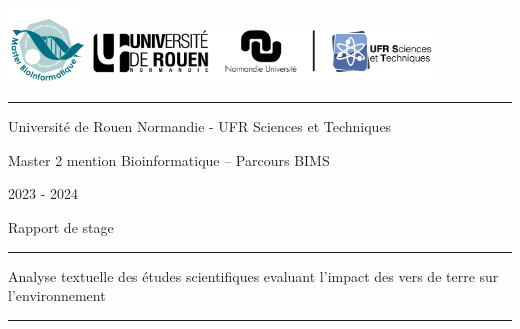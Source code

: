 \documentclass{book}
\begin{document}

\newpage
\thispagestyle{empty}
\vspace{-5cm}
\includegraphics[height=2cm]{univ.png}
\hfill
\includegraphics[height=1.5cm]{URN_NU_ST.jpg}

\vspace{0.5cm}
\hrule
\vspace{0.5cm}

\begin{center}
    \large{Université de Rouen Normandie - UFR Sciences et Techniques}
\end{center}

\begin{center}
    \large{Master 2 mention Bioinformatique – Parcours BIMS}
\end{center}

\begin{center}
    \large{2023 - 2024}
\end{center}

\vspace{1cm}

\begin{center}
    \Large{Rapport de stage}
\end{center}

\begin{center}
    \vspace{1cm}
    \hrule
    \vspace{1cm}
    \huge{Analyse textuelle des études scientifiques evaluant l’impact des vers
        de terre sur l’environnement }
    \vspace{1cm}
    \hrule
    \vspace{1cm}
\end{center}
\end{document}
